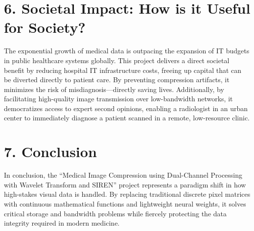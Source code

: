 \documentclass[12pt,a4paper]{article}
\begin{document}
\section*{6. Societal Impact: How is it Useful for Society?}
The exponential growth of medical data is outpacing the expansion of IT budgets in public healthcare systems globally. This project delivers a direct societal benefit by reducing hospital IT infrastructure costs, freeing up capital that can be diverted directly to patient care. By preventing compression artifacts, it minimizes the risk of misdiagnosis—directly saving lives. Additionally, by facilitating high-quality image transmission over low-bandwidth networks, it democratizes access to expert second opinions, enabling a radiologist in an urban center to immediately diagnose a patient scanned in a remote, low-resource clinic. 

\section*{7. Conclusion}
In conclusion, the ``Medical Image Compression using Dual-Channel Processing with Wavelet Transform and SIREN'' project represents a paradigm shift in how high-stakes visual data is handled. By replacing traditional discrete pixel matrices with continuous mathematical functions and lightweight neural weights, it solves critical storage and bandwidth problems while fiercely protecting the data integrity required in modern medicine.
\end{document}
